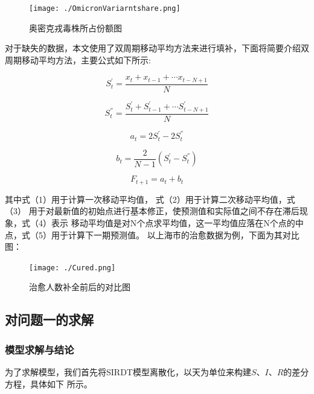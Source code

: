 \documentclass[bwprint]{gmcmthesis}
\numberwithin{figure}{section}
\begin{document}
\begin{figure}[!h]
    \centering
    \texttt{[image: ./OmicronVariarntshare.png]}
    \caption{奥密克戎毒株所占份额图}
    \label{fig1}
\end{figure}

\par 对于缺失的数据，本文使用了双周期移动平均方法来进行填补，下面将简要介绍双周期移动平均方法，主要公式如下所示:

\begin{equation}
    S_{t}^{'}=\dfrac{x_t+x_{t-1}+\cdots x_{t-N+1}}{N}
\end{equation}

\begin{equation}
    S_{t}^{''}=\dfrac{S_{t}^{'}+S_{t-1}^{'}+\cdots S_{t-N+1}^{'}}{N}
\end{equation}

\begin{equation}
    a_t=2S_{t}^{'}-2S_{t}^{''}
\end{equation}

\begin{equation}
    b_t=\dfrac{2}{N-1}\left( S_{t}^{'}-S_{t}^{''} \right) 
\end{equation}

\begin{equation}
    F_{t+1}=a_t+b_t
\end{equation}

\par 其中式（1）用于计算一次移动平均值， 式（2）用于计算二次移动平均值，式（3）
用于对最新值的初始点进行基本修正，使预测值和实际值之间不存在滞后现象，式（4）表示
移动平均值是对N个点求平均值，这一平均值应落在N个点的中点，式（5）用于计算下一期预测值。
以上海市的治愈数据为例，下面为其对比图：

\begin{figure}[!h]
    \centering
    \texttt{[image: ./Cured.png]}
    \caption{治愈人数补全前后的对比图}
    \label{fig1}
\end{figure}

\subsection{对问题一的求解}
\subsubsection{模型求解与结论}
\par 为了求解模型，我们首先将SIRDT模型离散化，以天为单位来构建$S$、$I$、$R$的差分方程，具体如下
所示。
\end{document}
